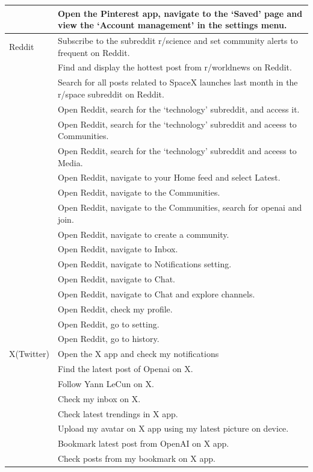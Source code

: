 \begin{longtable}{|p{1.8cm}|p{10.5cm}|}
        & Open the Pinterest app, navigate to the `Saved' page and view the `Account management' in the settings menu. \\
\hline
Reddit & Subscribe to the subreddit r/science and set community alerts to frequent on Reddit. \\
        & Find and display the hottest post from r/worldnews on Reddit. \\
        & Search for all posts related to SpaceX launches last month in the r/space subreddit on Reddit. \\
        & Open Reddit, search for the `technology' subreddit, and access it. \\
        & Open Reddit, search for the `technology' subreddit and aceess to Communities. \\
        & Open Reddit, search for the `technology' subreddit and aceess to Media. \\
        & Open Reddit, navigate to your Home feed and select Latest. \\
        & Open Reddit, navigate to the Communities. \\
        & Open Reddit, navigate to the Communities, search for openai and join. \\
        & Open Reddit, navigate to create a community. \\
        & Open Reddit, navigate to Inbox. \\
        & Open Reddit, navigate to Notifications setting. \\
        & Open Reddit, navigate to Chat. \\
        & Open Reddit, navigate to Chat and explore channels. \\
        \hline
        & Open Reddit, check my profile. \\
        & Open Reddit, go to setting. \\
        & Open Reddit, go to history. \\
\hline
X(Twitter) & Open the X app and check my notifications \\
        & Find the latest post of Openai on X. \\
        & Follow Yann LeCun on X. \\
        & Check my inbox on X. \\
        & Check latest trendings in X app. \\
        & Upload my avatar on X app using my latest picture on device. \\
        & Bookmark latest post from OpenAI on X app. \\
        & Check posts from my bookmark on X app. \\
\hline
\end{longtable}

